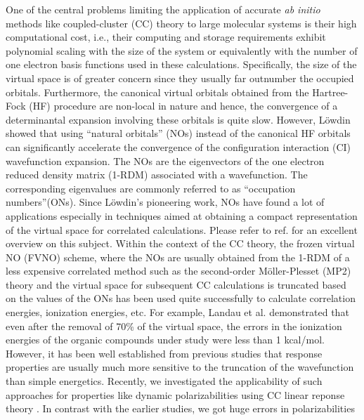 One of the central problems limiting the application of accurate {\em ab
initio} methods like coupled-cluster (CC) theory to large molecular systems is their high 
computational cost, i.e., their computing and storage requirements 
exhibit polynomial scaling with the size of the system or equivalently
with the number of one electron basis functions used in these calculations.
Specifically, the size of the virtual space is of greater concern since  
they usually far outnumber the occupied orbitals. Furthermore, the canonical virtual orbitals
obtained from the Hartree-Fock (HF) procedure are non-local in nature and hence, 
the convergence of a determinantal expansion involving these orbitals
is quite slow. However, L{\"o}wdin \cite{Lowdin55}showed that using 
``natural orbitals'' (NOs) instead of the canonical HF orbitals can significantly 
accelerate the convergence of the configuration interaction (CI)
wavefunction expansion. The NOs are the eigenvectors of the 
one electron reduced density matrix (1-RDM) associated with a wavefunction. 
The corresponding eigenvalues are commonly referred to 
as ``occupation numbers''(ONs). Since L{\"o}wdin's pioneering 
work, NOs have found a lot of applications especially in techniques 
aimed at obtaining a compact representation of the virtual space for 
correlated calculations\cite{DePrince13,DePrince13:FNOs,Landau10,Sosa89,Taube05,Taube08}.
Please refer to ref.\cite{Landau10} for an excellent overview on this subject. 
Within the context of the CC theory, the frozen virtual NO (FVNO) scheme, where 
the NOs are usually obtained from the 1-RDM of a less expensive correlated method 
such as the second-order M{\"o}ller-Plesset (MP2) theory and the virtual space for subsequent 
CC calculations is truncated based on the values of the ONs has been used quite 
successfully to calculate correlation energies, 
ionization energies, etc. For example, Landau et al.\cite{Landau10} demonstrated 
that even after the removal of 70\% of the virtual space, the errors in
the ionization energies of the organic compounds under study were less than 1 kcal/mol.
However, it has been well established from previous studies that response 
properties are usually much more sensitive to the truncation of the wavefunction 
than simple energetics\cite{Korona04,Russ04,Russ08,McAlexander12,Friedrich15,McAlexander15:LRCC}. 
Recently, we investigated the applicability of such 
approaches for properties like dynamic polarizabilities using CC linear reponse theory
\cite{Koch90}. In contrast with the earlier studies\cite{Kumar17}, we got huge errors in polarizabilities 

